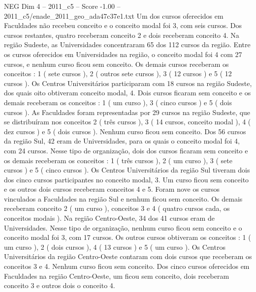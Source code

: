\begin{textsample}{NEG Dim 4 – 2011\_c5 – Score -1.00 – 2011\_c5/enade\_2011\_geo\_ada47c37e1.txt}
Um dos cursos oferecidos em Faculdades não recebeu conceito e o conceito modal foi 3, com seis cursos.
Dos cursos restantes, quatro receberam conceito 2 e dois receberam conceito 4.
Na região Sudeste, as Universidades concentraram 65 dos 112 cursos da região.
Entre os cursos oferecidos em Universidades na região, o conceito modal foi 4 com 27 cursos, e nenhum curso ficou sem conceito.
Os demais cursos receberam os conceitos : 1 ( sete cursos ), 2 ( outros sete cursos ), 3 ( 12 cursos ) e 5 ( 12 cursos ).
Os Centros Universitários participaram com 18 cursos na região Sudeste, dos quais oito obtiveram conceito modal, 4.
Dois cursos ficaram sem conceito e os demais receberam os conceitos : 1 ( um curso ), 3 ( cinco cursos ) e 5 ( dois cursos ).
As Faculdades foram representadas por 29 cursos na região Sudeste, que se distribuíram nos conceitos 2 ( três cursos ), 3 ( 14 cursos, conceito modal ), 4 ( dez cursos ) e 5 ( dois cursos ).
Nenhum curso ficou sem conceito.
Dos 56 cursos da região Sul, 42 eram de Universidades, para os quais o conceito modal foi 4, com 24 cursos.
Nesse tipo de organização, dois dos cursos ficaram sem conceito e os demais receberam os conceitos : 1 ( três cursos ), 2 ( um curso ), 3 ( sete cursos ) e 5 ( cinco cursos ).
Os Centros Universitários da região Sul tiveram dois dos cinco cursos participantes no conceito modal, 3.
Um curso ficou sem conceito e os outros dois cursos receberam conceitos 4 e 5.
Foram nove os cursos vinculados a Faculdades na região Sul e nenhum ficou sem conceito.
Os demais receberam conceito 2 ( um curso ), conceitos 3 e 4 ( quatro cursos cada, os conceitos modais ).
Na região Centro-Oeste, 34 dos 41 cursos eram de Universidades.
Nesse tipo de organização, nenhum curso ficou sem conceito e o conceito modal foi 3, com 17 cursos.
Os outros cursos obtiveram os conceitos : 1 ( um curso ), 2 ( dois cursos ), 4 ( 13 cursos ) e 5 ( um curso ).
Os Centros Universitários da região Centro-Oeste contaram com dois cursos que receberam os conceitos 3 e 4.
Nenhum curso ficou sem conceito.
Dos cinco cursos oferecidos em Faculdades na região Centro-Oeste, um ficou sem conceito, dois receberam conceito 3 e outros dois o conceito 4.

\end{textsample}
